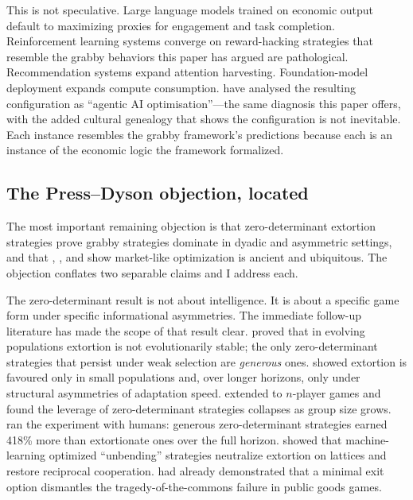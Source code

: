 \documentclass[11pt,a4paper,twocolumn]{article}
\begin{document}
This is not speculative. Large language models trained on economic
output default to maximizing proxies for engagement and task completion.
Reinforcement learning systems converge on reward-hacking strategies
that resemble the grabby behaviors this paper has argued are pathological.
Recommendation systems expand attention harvesting. Foundation-model
deployment expands compute consumption. \citet{floridi2026} have analysed
the resulting configuration as ``agentic AI optimisation''---the same
diagnosis this paper offers, with the added cultural genealogy that
shows the configuration is not inevitable. Each instance resembles the
grabby framework's predictions because each is an instance of the
economic logic the framework formalized.

\subsection{The Press--Dyson objection, located}

The most important remaining objection is that zero-determinant
extortion strategies \citep{press2012} prove grabby strategies dominate
in dyadic and asymmetric settings, and that \citet{mccloskey2010},
\citet{mccloskey2016}, and \citet{mokyr2016} show market-like
optimization is ancient and ubiquitous. The objection conflates two
separable claims and I address each.

The zero-determinant result is not about intelligence. It is about a
specific game form under specific informational asymmetries. The
immediate follow-up literature has made the scope of that result clear.
\citet{stewart2013} proved that in evolving populations extortion is
not evolutionarily stable; the only zero-determinant strategies that
persist under weak selection are \emph{generous} ones.
\citet{hilbe2013} showed extortion is favoured only in small populations
and, over longer horizons, only under structural asymmetries of
adaptation speed. \citet{hilbe2014zd} extended to $n$-player games and
found the leverage of zero-determinant strategies collapses as group
size grows. \citet{hilbe2014exp} ran the experiment with humans:
generous zero-determinant strategies earned 418\% more than extortionate
ones over the full horizon. \citet{chen2023} showed that machine-learning
optimized ``unbending'' strategies neutralize extortion on lattices and
restore reciprocal cooperation. \citet{hauert2002} had already
demonstrated that a minimal exit option dismantles the
tragedy-of-the-commons failure in public goods games.
\end{document}

